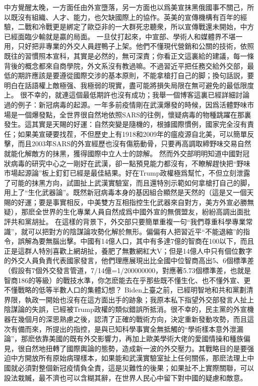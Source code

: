 \documentclass[twocolumn]{ctexart}
\begin{document}
中方覺醒太晚，一方面任由外宣墮落，另一方面也以爲美宣抹黑俄國事不關己，所以既沒有組織、人才、能力，也欠缺國際上的協作。英美的宣傳機構有百年的經驗，二戰和冷戰更是綁定了歐亞非的一大群死忠聽衆，所以宣傳戰還未開始，中方已經面臨少輸就是贏的局面。
一旦仗打起來，中宣部、學術人和媒體界不堪一用，只好把非專業的外交人員趕鴨子上架。他們不懂現代營銷和公關的技術，依照既往的習慣照本宣科，其實是必然的，無可深責；你看正文這裏給的建議，每一條背後的概念都來自商學院，外文系沒有教過嘛。不過習近平把任務交給外交部，最低的期許應該是要遵從國際交涉的基本原則，不能拿槍打自己的脚；換句話説，要明白在話語權上敵極强、我極弱的現實，盡可能將損失局限在無可避免的最低限度上。
很不幸的，就連這個最低期許也沒有成功；我舉一個博客這裏已經詳細討論過的例子：新冠病毒的起源。一年多前疫情剛在武漢爆發的時候，因爲活體野味市場是一個爆發點，全世界很自然地依照SARS的往例，懷疑病毒的物種跳躍在那裏發生。這其實是天賜的好運：自然突變是隨機的，根據國際慣例，國家完全沒有責任；如果美宣硬要找茬，不但歷史上有1918和2009年的瘟疫源自北美，可以簡單反擊，而且2003年SARS的外宣經歷也沒有傷筋動骨，只要再高調取締野味交易自然就能化解敵方的抹黑，獲得國際中立人士的諒解。
然而外交部明明知道中國對冠狀病毒的研究中心之一剛好在武漢，卻一點預見能力都沒有，不瞭解趕快把“野味市場起源論”板上釘釘已經是最佳結果。好在Trump政權極爲幫忙，不但立刻泄露了可能的抹黑方向，試圖扯上武漢實驗室，而且還特別示範如何拿槍打自己的脚，用上了“生化武器論”。既然新冠病毒本身的基因組合顯然是天然的（這是又一個天賜的好運；要是事實相反，中美雙方互相指控生化武器來自對方，美方外宣必勝無疑），那麽全世界的生化專業人員自然成爲中國外宣的無償盟友，紛紛高調出面批評共和黨胡扯。
在這樣的背景下，外交部只要簡單重複一句“我們尊重科學專業常識”，就可以把對方的陰謀論攻勢化解於無形。偏偏有人把習近平“不能退縮”的指令，誤解為要無腦出擊。中國有14億人口，其中有多達7億的智商在100以下，而且正是這群人特別喜歡上網胡扯，養肥了無數網紅大V；但是14億人中只有個位數字的外交人員負責代表國家發言，他們理應展現出比全國中位智商高出5、6個標準差（假設有7個外交發言管道，7/14億=1/200000000，對應著5.73個標準差，也就是智商186的等級）的戰技水準，你怎麽能去在乎那些既不懂生化、也不懂外宣、更不懂戰略的低等半數人口的集體幻想？
Biden上臺之前，已經明智地和共和黨劃清界限，執政一開始也沒有在這方面出手的跡象；我原本私下指望外交部發言人扯上陰謀論的失誤，已經被Trump政權的類似錯誤所抵消。很不幸的，民主黨的外宣機器在幾個月的深思熟慮之後，認清了正確的戰術方向，決定重新發動攻勢，而且這次有備而來，所提出的指控，是與已知科學事實全無抵觸的“學術樣本意外泄漏論”，那麽依靠美國的既有外交影響力，再加上歐美學術大佬的愛國情操和種族偏見，很自然地扭轉了國際輿論的態勢，造成新一波的外交壓力。其戰略目的是要强迫中方開放所有原始病理樣本，如果能和武漢實驗室扯上任何關係，那麽法理上中國就必須對整個新冠疫情負全責，這是災難性的後果；如果扯不上實際關聯，可以設法栽贓，最不濟也可以含糊其辭，在世界人民心中留下對中國的疑慮和敵意。
\end{document}
